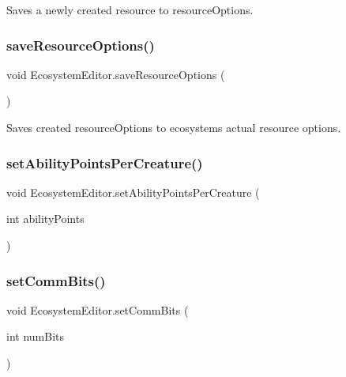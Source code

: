 Saves a newly created resource to resource\+Options. 

\mbox{\label{class_ecosystem_editor_af57a50510d4baf7cc372fc2b32c38ead}} 
\subsubsection{\texorpdfstring{save\+Resource\+Options()}{saveResourceOptions()}}
{\footnotesize\ttfamily void Ecosystem\+Editor.\+save\+Resource\+Options (\begin{DoxyParamCaption}{ }\end{DoxyParamCaption})}



Saves created resource\+Options to ecosystems actual resource options. 

\mbox{\label{class_ecosystem_editor_a9ac3559972dcc89445df6a6817c938f0}} 
\subsubsection{\texorpdfstring{set\+Ability\+Points\+Per\+Creature()}{setAbilityPointsPerCreature()}}
{\footnotesize\ttfamily void Ecosystem\+Editor.\+set\+Ability\+Points\+Per\+Creature (\begin{DoxyParamCaption}\item[{int}]{ability\+Points }\end{DoxyParamCaption})}

\mbox{\label{class_ecosystem_editor_a079f04c589520a420be5c749dcb81447}} 
\subsubsection{\texorpdfstring{set\+Comm\+Bits()}{setCommBits()}}
{\footnotesize\ttfamily void Ecosystem\+Editor.\+set\+Comm\+Bits (\begin{DoxyParamCaption}\item[{int}]{num\+Bits }\end{DoxyParamCaption})}

